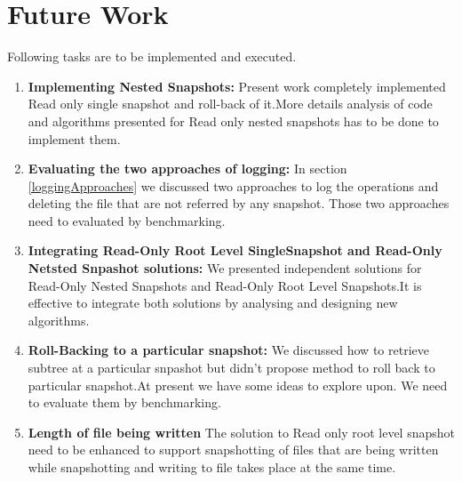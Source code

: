 \section{Future Work}
Following tasks are to be implemented and executed.
\begin{enumerate}
\item \textbf{Implementing Nested Snapshots:}
Present work completely implemented Read only single snapshot and roll-back of it.More details analysis of code and algorithms presented for Read only nested snapshots has to be done to implement them.
\item \textbf{Evaluating the two approaches of logging:}
In section \ref{loggingApproaches} we discussed two approaches to log the operations and deleting the file that are not referred by any snapshot. Those two approaches need to evaluated by benchmarking.
\item \textbf{Integrating Read-Only Root Level SingleSnapshot and Read-Only Netsted Snpashot solutions:}
We presented independent solutions for Read-Only Nested Snapshots and Read-Only Root Level Snapshots.It is effective to integrate both solutions by analysing and designing new algorithms.
\item \textbf{Roll-Backing to a particular snapshot:}
We discussed how to retrieve subtree at a particular snpashot but didn't propose method to roll back to particular snapshot.At present we have some ideas to explore upon. We need to evaluate them by benchmarking.
\item \textbf{Length of file being written} The solution to Read only root level snapshot need to be enhanced to support snapshotting of files that are being written while snapshotting and writing to file takes place at the same time.
\end{enumerate}






